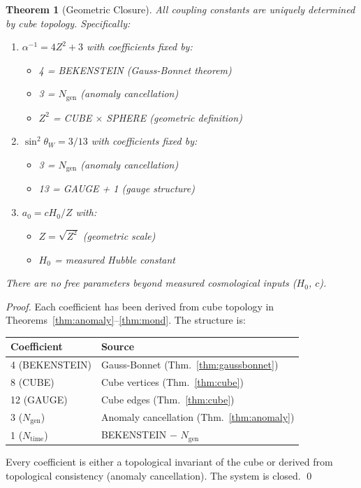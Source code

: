 \documentclass[twocolumn,showpacs,preprintnumbers,amsmath,amssymb,prd]{revtex4-2}
\newtheorem{theorem}{Theorem}[section]
\begin{document}
\begin{theorem}[Geometric Closure]
\label{thm:closure}
All coupling constants are uniquely determined by cube topology. Specifically:
\begin{enumerate}
\item $\alpha^{-1} = 4Z^2 + 3$ with coefficients fixed by:
    \begin{itemize}
    \item 4 = BEKENSTEIN (Gauss-Bonnet theorem)
    \item 3 = $N_{\text{gen}}$ (anomaly cancellation)
    \item $Z^2$ = CUBE $\times$ SPHERE (geometric definition)
    \end{itemize}
\item $\sin^2\theta_W = 3/13$ with coefficients fixed by:
    \begin{itemize}
    \item 3 = $N_{\text{gen}}$ (anomaly cancellation)
    \item 13 = GAUGE + 1 (gauge structure)
    \end{itemize}
\item $a_0 = cH_0/Z$ with:
    \begin{itemize}
    \item $Z = \sqrt{Z^2}$ (geometric scale)
    \item $H_0$ = measured Hubble constant
    \end{itemize}
\end{enumerate}
There are no free parameters beyond measured cosmological inputs ($H_0$, $c$).
\end{theorem}

\begin{proof}
Each coefficient has been derived from cube topology in Theorems~\ref{thm:anomaly}--\ref{thm:mond}. The structure is:

\begin{center}
\begin{tabular}{ll}
\hline
Coefficient & Source \\
\hline
4 (BEKENSTEIN) & Gauss-Bonnet (Thm.~\ref{thm:gaussbonnet}) \\
8 (CUBE) & Cube vertices (Thm.~\ref{thm:cube}) \\
12 (GAUGE) & Cube edges (Thm.~\ref{thm:cube}) \\
3 ($N_{\text{gen}}$) & Anomaly cancellation (Thm.~\ref{thm:anomaly}) \\
1 ($N_{\text{time}}$) & BEKENSTEIN $-$ $N_{\text{gen}}$ \\
\hline
\end{tabular}
\end{center}

Every coefficient is either a topological invariant of the cube or derived from topological consistency (anomaly cancellation). The system is closed. \qed
\end{proof}
\end{document}

